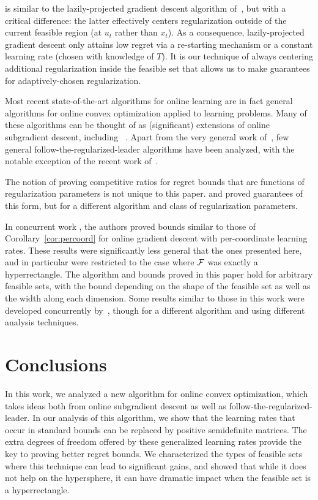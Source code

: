 \FTPRL is similar to the lazily-projected gradient descent
algorithm of~\cite[Sec. 5.2.3]{zinkevich04thesis}, but with
a critical difference: the latter
effectively centers regularization outside of the current
feasible region (at $u_t$ rather than $x_t$).
As a consequence, lazily-projected gradient descent
only attains low regret via a re-starting mechanism or a constant
learning rate (chosen with knowledge of $T$).  It is our technique of
always centering additional regularization inside the feasible set
that allows us to make guarantees for adaptively-chosen
regularization.

Most recent state-of-the-art algorithms for online learning are in
fact general algorithms for online convex optimization applied to
learning problems.  Many of these algorithms can be thought of as
(significant) extensions of online subgradient descent, including
~\cite{duchi09fobos,do09proximal,shwartz07pegasos}.  Apart from the very
general work of~\cite{kv03}, few general follow-the-regularized-leader
algorithms have been analyzed, with the notable exception of the
recent work of~.

The notion of proving competitive ratios for regret bounds that are
functions of regularization parameters is not unique to this paper.
 and  proved guarantees of
this form, but for a different algorithm and class of regularization
parameters.

In concurrent work \cite{streeter10percoord}, the
authors proved bounds similar to those of Corollary~\ref{cor:percoord}
for online gradient descent with per-coordinate learning rates.  These
results were significantly less general that the ones presented here,
and in particular were
restricted to the case where $\mathcal{F}$ was exactly a hyperrectangle.  The
\FTPRL algorithm and bounds proved in this paper hold for arbitrary
feasible sets, with the bound depending on the shape of the feasible set
as well as the width along each dimension.
Some results similar to those in this work
were developed concurrently by~, though for a
different algorithm and using different analysis techniques.

\section{Conclusions}
In this work, we analyzed a new algorithm for online convex
optimization, which takes ideas both from online subgradient descent
as well as follow-the-regularized-leader.  In our
analysis of this algorithm, we show that the learning rates that occur
in standard bounds can be replaced by positive semidefinite matrices.
The extra degrees of freedom offered by these generalized learning
rates provide the key to proving better regret bounds.  We
characterized the types of feasible sets where this technique can lead
to significant gains, and showed that while it
does not help on the hypersphere, it can have dramatic impact when the
feasible set is a hyperrectangle.

